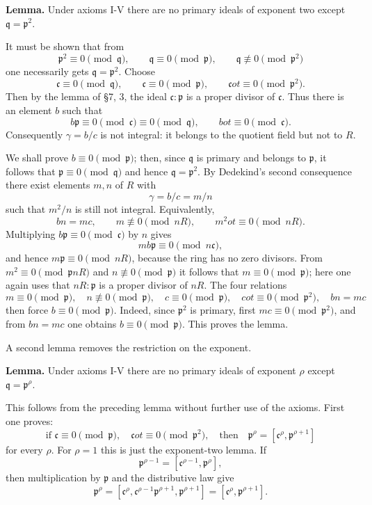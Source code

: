 \documentclass[
  12pt,
]{article}
\begin{document}
\textbf{Lemma.} Under axioms I-V there are no primary ideals of exponent
two except \(\mathfrak q=\mathfrak p^2\).

It must be shown that from \[
  \mathfrak p^2\equiv0\pmod{\mathfrak q},\qquad
  \mathfrak q\equiv0\pmod{\mathfrak p},\qquad
  \mathfrak q\not\equiv0\pmod{\mathfrak p^2}
\] one necessarily gets \(\mathfrak q=\mathfrak p^2\). Choose \[
  \mathfrak c\equiv0\pmod{\mathfrak q},\qquad
  \mathfrak c\equiv0\pmod{\mathfrak p},\qquad
  \mathfrak c
ot\equiv0\pmod{\mathfrak p^2}.
\] Then by the lemma of §7, 3, the ideal \(\mathfrak c:\mathfrak p\) is
a proper divisor of \(\mathfrak c\). Thus there is an element \(b\) such
that \[
  b\mathfrak p\equiv0\pmod{\mathfrak c}
      \equiv0\pmod{\mathfrak q},
  \qquad b
ot\equiv0\pmod{\mathfrak c}.
\] Consequently \(\gamma=b/c\) is not integral: it belongs to the
quotient field but not to \(R\).

We shall prove \(b\equiv0\pmod{\mathfrak p}\); then, since
\(\mathfrak q\) is primary and belongs to \(\mathfrak p\), it follows
that \(\mathfrak p\equiv0\pmod{\mathfrak q}\) and hence
\(\mathfrak q=\mathfrak p^2\). By Dedekind's second consequence there
exist elements \(m,n\) of \(R\) with \[
  \gamma=b/c=m/n
\] such that \(m^2/n\) is still not integral. Equivalently, \[
  bn=mc,
  \qquad m\not\equiv0\pmod{nR},
  \qquad m^2
ot\equiv0\pmod{nR}.
\] Multiplying \(b\mathfrak p\equiv0\pmod{\mathfrak c}\) by \(n\) gives
\[
  mb\mathfrak p\equiv0\pmod{n\mathfrak c},
\] and hence \(m\mathfrak p\equiv0\pmod{nR}\), because the ring has no
zero divisors. From \(m^2\equiv0\pmod{\mathfrak p nR}\) and
\(n\not\equiv0\pmod{\mathfrak p}\) it follows that
\(m\equiv0\pmod{\mathfrak p}\); here one again uses that
\(nR:\mathfrak p\) is a proper divisor of \(nR\). The four relations \[
  m\equiv0\pmod{\mathfrak p},
  \quad n\not\equiv0\pmod{\mathfrak p},
  \quad c\equiv0\pmod{\mathfrak p},
  \quad c
ot\equiv0\pmod{\mathfrak p^2},
  \quad bn=mc
\] then force \(b\equiv0\pmod{\mathfrak p}\). Indeed, since
\(\mathfrak p^2\) is primary, first \(mc\equiv0\pmod{\mathfrak p^2}\),
and from \(bn=mc\) one obtains \(b\equiv0\pmod{\mathfrak p}\). This
proves the lemma.

A second lemma removes the restriction on the exponent.

\textbf{Lemma.} Under axioms I-V there are no primary ideals of exponent
\(\rho\) except \(\mathfrak q=\mathfrak p^{\rho}\).

This follows from the preceding lemma without further use of the axioms.
First one proves: \[
  \text{if }\mathfrak c\equiv0\pmod{\mathfrak p},\quad
  \mathfrak c
ot\equiv0\pmod{\mathfrak p^2},
  \quad\text{then}\quad
  \mathfrak p^{\rho}=[\mathfrak c^{\rho},\mathfrak p^{\rho+1}]
\] for every \(\rho\). For \(\rho=1\) this is just the exponent-two
lemma. If \[
  \mathfrak p^{\rho-1}=[\mathfrak c^{\rho-1},\mathfrak p^{\rho}],
\] then multiplication by \(\mathfrak p\) and the distributive law give
\[
  \mathfrak p^{\rho}=
  [\mathfrak c^{\rho},\mathfrak c^{\rho-1}\mathfrak p^{\rho+1},\mathfrak p^{\rho+1}]
  =[
    \mathfrak c^{\rho},\mathfrak p^{\rho+1}].
\]
\end{document}
